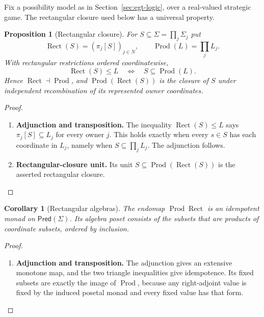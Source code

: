 \documentclass[11pt,a4paper]{article}
\numberwithin{equation}{section}
\newtheorem{proposition}[theorem]{Proposition}
\newtheorem{corollary}[theorem]{Corollary}
\theoremstyle{definition}
\theoremstyle{remark}
\theoremstyle{plain}
\begin{document}
Fix a possibility model as in Section~\ref{sec:egt-logic}, over a real-valued strategic game. The
rectangular closure used below has a universal property.

\begin{proposition}[Rectangular closure]
\label{prop:egt-rectangular-reflection}
For $S\subseteq\Sigma=\prod_j\Sigma_j$ put
\[
 \operatorname{Rect}(S)=(\pi_j[S])_{j\in N},
 \qquad
 \operatorname{Prod}(L)=\prod_jL_j.
\]
With rectangular restrictions ordered coordinatewise,
\begin{equation}
\label{eq:egt-rectangular-reflection}
 \operatorname{Rect}(S)\leq L
 \quad\Longleftrightarrow\quad
 S\subseteq\operatorname{Prod}(L).
\end{equation}
Hence $\operatorname{Rect}\dashv\operatorname{Prod}$, and
$\operatorname{Prod}(\operatorname{Rect}(S))$ is the closure of $S$ under
independent recombination of its represented owner coordinates.
\end{proposition}
\begin{proof}
\leavevmode
\begin{enumerate}[label=\textup{(\arabic*)},leftmargin=*,itemsep=4pt,topsep=3pt]
  \item \textbf{Adjunction and transposition.} The inequality $\operatorname{Rect}(S)\leq L$ says
$\pi_j[S]\subseteq L_j$ for every owner $j$. This holds exactly when every
$s\in S$ has each coordinate in $L_j$, namely when
$S\subseteq\prod_jL_j$. The adjunction follows.
  \item \textbf{Rectangular-closure unit.} Its unit
$S\subseteq\operatorname{Prod}(\operatorname{Rect}(S))$ is the asserted
rectangular closure.
\end{enumerate}
\end{proof}

\begin{corollary}[Rectangular algebras]
The endomap $\operatorname{Prod}\operatorname{Rect}$ is an idempotent
monad on $\mathsf{Pred}(\Sigma)$. Its algebra poset consists of the
subsets that are products of coordinate subsets, ordered by inclusion.
\end{corollary}
\begin{proof}
\leavevmode
\begin{enumerate}[label=\textup{(\arabic*)},leftmargin=*,itemsep=4pt,topsep=3pt]
  \item \textbf{Adjunction and transposition.} The adjunction gives an extensive monotone map, and the two triangle
inequalities give idempotence. Its fixed subsets are exactly the image
of $\operatorname{Prod}$, because any right-adjoint value is fixed by
the induced posetal monad and every fixed value has that form.
\end{enumerate}
\end{proof}
\end{document}
